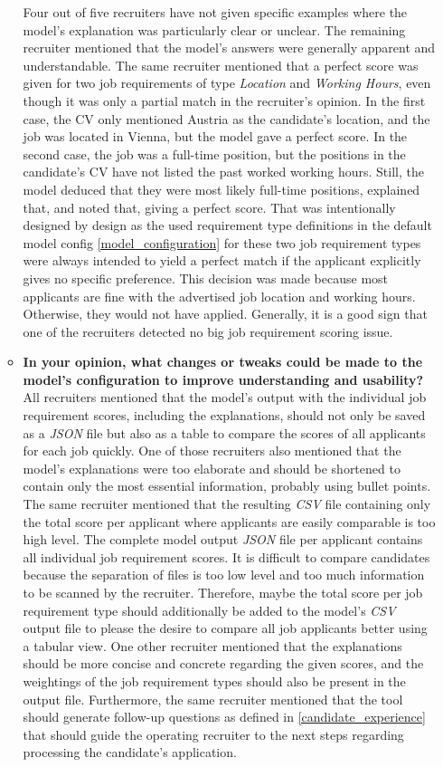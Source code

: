 \documentclass[draft,final]{thesisclass} %
\begin{document}
\begin{enumerate}
\begin{itemize}
        Four out of five recruiters have not given specific examples where the model's explanation was particularly clear or unclear. The remaining recruiter mentioned that the model's answers were generally apparent and understandable. The same recruiter mentioned that a perfect score was given for two job requirements of type \textit{Location} and \textit{Working Hours}, even though it was only a partial match in the recruiter's opinion. In the first case, the \acs{CV} only mentioned Austria as the candidate's location, and the job was located in Vienna, but the model gave a perfect score. In the second case, the job was a full-time position, but the positions in the candidate's \acs{CV} have not listed the past worked working hours. Still, the model deduced that they were most likely full-time positions, explained that, and noted that, giving a perfect score. That was intentionally designed by design as the used requirement type definitions in the default model config \ref{model_configuration} for these two job requirement types were always intended to yield a perfect match if the applicant explicitly gives no specific preference. This decision was made because most applicants are fine with the advertised job location and working hours. Otherwise, they would not have applied. Generally, it is a good sign that one of the recruiters detected no big job requirement scoring issue.
        \item \textbf{In your opinion, what changes or tweaks could be made to the model's configuration to improve understanding and usability?}
        All recruiters mentioned that the model's output with the individual job requirement scores, including the explanations, should not only be saved as a \textit{JSON} file but also as a table to compare the scores of all applicants for each job quickly. One of those recruiters also mentioned that the model's explanations were too elaborate and should be shortened to contain only the most essential information, probably using bullet points. The same recruiter mentioned that the resulting \textit{CSV} file containing only the total score per applicant where applicants are easily comparable is too high level. The complete model output \textit{JSON} file per applicant contains all individual job requirement scores. It is difficult to compare candidates because the separation of files is too low level and too much information to be scanned by the recruiter. Therefore, maybe the total score per job requirement type should additionally be added to the model's \textit{CSV} output file to please the desire to compare all job applicants better using a tabular view. One other recruiter mentioned that the explanations should be more concise and concrete regarding the given scores, and the weightings of the job requirement types should also be present in the output file. Furthermore, the same recruiter mentioned that the tool should generate follow-up questions as defined in \ref{candidate_experience} that should guide the operating recruiter to the next steps regarding processing the candidate's application.

\end{itemize}
\end{enumerate}
\end{document}
